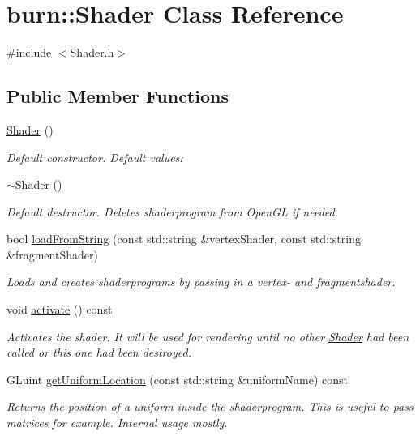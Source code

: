 \hypertarget{classburn_1_1_shader}{\section{burn\-:\-:Shader Class Reference}
\label{classburn_1_1_shader}
}


{\ttfamily \#include $<$Shader.\-h$>$}

\subsection*{Public Member Functions}
\begin{DoxyCompactItemize}
\item 
\hyperlink{classburn_1_1_shader_a9795869452f44ff05a2a4b1f278bc990}{Shader} ()
\begin{DoxyCompactList}\small\item\em Default constructor. Default values\-: \end{DoxyCompactList}\item 
\hyperlink{classburn_1_1_shader_a4f67c0a15b6cf9146869cfbcdbdfb541}{$\sim$\-Shader} ()
\begin{DoxyCompactList}\small\item\em Default destructor. Deletes shaderprogram from Open\-G\-L if needed. \end{DoxyCompactList}\item 
bool \hyperlink{classburn_1_1_shader_ae2975b4b68d38d8aa3d045df082e7c2a}{load\-From\-String} (const std\-::string \&vertex\-Shader, const std\-::string \&fragment\-Shader)
\begin{DoxyCompactList}\small\item\em Loads and creates shaderprograms by passing in a vertex-\/ and fragmentshader. \end{DoxyCompactList}\item 
void \hyperlink{classburn_1_1_shader_a8f476e17b38b96d84ea57c31d7aab78d}{activate} () const 
\begin{DoxyCompactList}\small\item\em Activates the shader. It will be used for rendering until no other \hyperlink{classburn_1_1_shader}{Shader} had been called or this one had been destroyed. \end{DoxyCompactList}\item 
G\-Luint \hyperlink{classburn_1_1_shader_ae96b86c6da489d759bec9be7664040dc}{get\-Uniform\-Location} (const std\-::string \&uniform\-Name) const 
\begin{DoxyCompactList}\small\item\em Returns the position of a uniform inside the shaderprogram. This is useful to pass matrices for example. Internal usage mostly. \end{DoxyCompactList}\end{DoxyCompactItemize}


